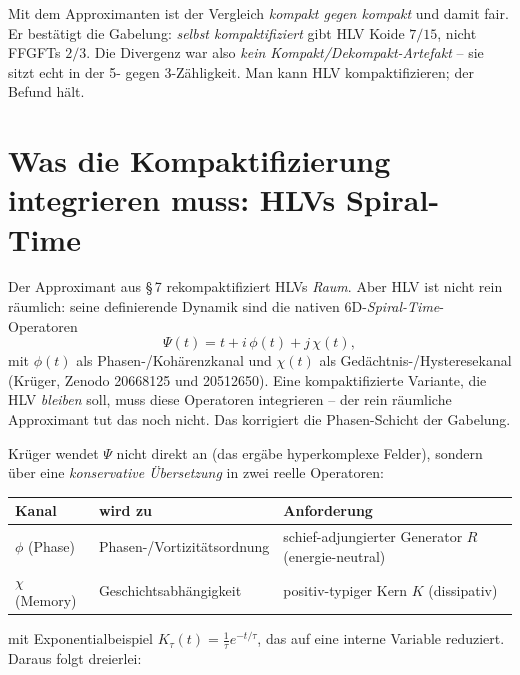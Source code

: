 \begin{keyresult}
Mit dem Approximanten ist der Vergleich \emph{kompakt gegen kompakt} und damit
fair. Er bestätigt die Gabelung: \emph{selbst kompaktifiziert} gibt HLV Koide
$7/15$, nicht FFGFTs $2/3$. Die Divergenz war also \emph{kein
Kompakt/Dekompakt-Artefakt} -- sie sitzt echt in der 5- gegen 3-Zähligkeit. Man
kann HLV kompaktifizieren; der Befund hält.
\end{keyresult}

\section{Was die Kompaktifizierung integrieren muss: HLVs Spiral-Time}

Der Approximant aus §\,7 rekompaktifiziert HLVs \emph{Raum}. Aber HLV ist nicht
rein räumlich: seine definierende Dynamik sind die nativen 6D-\emph{Spiral-Time}-Operatoren
\begin{equation}
\Psi(t)=t+i\,\phi(t)+j\,\chi(t),
\end{equation}
mit $\phi(t)$ als Phasen-/Kohärenzkanal und $\chi(t)$ als Gedächtnis-/Hysteresekanal
(Krüger, Zenodo 20668125 und 20512650). Eine kompaktifizierte Variante, die HLV
\emph{bleiben} soll, muss diese Operatoren integrieren -- der rein räumliche
Approximant tut das noch nicht. Das korrigiert die Phasen-Schicht der Gabelung.

Krüger wendet $\Psi$ nicht direkt an (das ergäbe hyperkomplexe Felder), sondern über
eine \emph{konservative Übersetzung} in zwei reelle Operatoren:
\begin{center}
\begin{tabular}{lll}
\toprule
Kanal & wird zu & Anforderung \\
\midrule
$\phi$ (Phase) & Phasen-/Vortizitätsordnung & schief-adjungierter Generator $R$ (energie-neutral) \\
$\chi$ (Memory) & Geschichtsabhängigkeit & positiv-typiger Kern $K$ (dissipativ) \\
\bottomrule
\end{tabular}
\end{center}
mit Exponentialbeispiel $K_\tau(t)=\tfrac1\tau e^{-t/\tau}$, das auf eine interne
Variable reduziert. Daraus folgt dreierlei:

